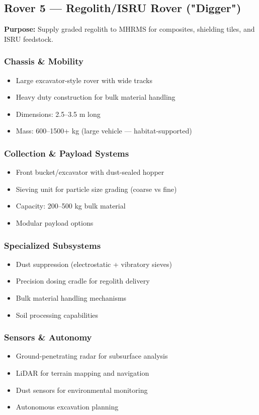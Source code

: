 \documentclass[12pt, a4paper]{article}
\begin{document}
\subsection{Rover 5 — Regolith/ISRU Rover ("Digger")}

\textbf{Purpose:} Supply graded regolith to MHRMS for composites, shielding tiles, and ISRU feedstock.

\subsubsection{Chassis \& Mobility}
\begin{itemize}
    \item Large excavator-style rover with wide tracks
    \item Heavy duty construction for bulk material handling
    \item Dimensions: 2.5–3.5 m long
    \item Mass: 600–1500+ kg (large vehicle — habitat-supported)
\end{itemize}

\subsubsection{Collection \& Payload Systems}
\begin{itemize}
    \item Front bucket/excavator with dust-sealed hopper
    \item Sieving unit for particle size grading (coarse vs fine)
    \item Capacity: 200–500 kg bulk material
    \item Modular payload options
\end{itemize}

\subsubsection{Specialized Subsystems}
\begin{itemize}
    \item Dust suppression (electrostatic + vibratory sieves)
    \item Precision dosing cradle for regolith delivery
    \item Bulk material handling mechanisms
    \item Soil processing capabilities
\end{itemize}

\subsubsection{Sensors \& Autonomy}
\begin{itemize}
    \item Ground-penetrating radar for subsurface analysis
    \item LiDAR for terrain mapping and navigation
    \item Dust sensors for environmental monitoring
    \item Autonomous excavation planning
\end{itemize}
\end{document}
